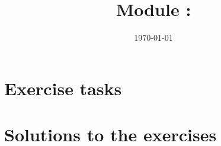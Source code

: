 \documentclass[twoside, a4paper]{article}
\title{Module \GetItDigitalModulnumber: \GetItDigitalModulname}
\author{}
\institute{GET it digital}
\date{\today}
\begin{document}

{\setlength{\parskip}{0.05ex}    %
	\tableofcontents
	\newpage
}

\printnomenclature
\cleardoublepage

\pagestyle{fancyplain}
\setheadkapitel

\cleardoublepage




\cleardoublepage
\appendix
\setheadanhang

\section{Exercise tasks}
\renewcommand{\Aufgabe}[1]{#1}
\renewcommand{\Loesung}[1]{}


\section{Solutions to the exercises}
\renewcommand{\Aufgabe}[1]{}
\renewcommand{\Loesung}[1]{#1}


\clearpage
{}
\printbibliography

\clearpage
{}
\printindex
\end{document}
